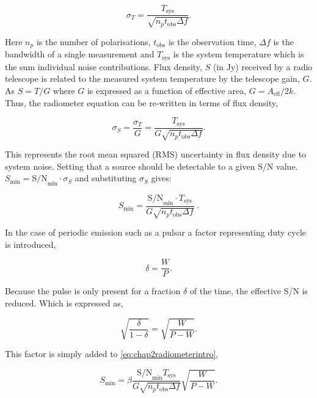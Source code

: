 \begin{equation}
    \sigma_T = \frac{T_{\text{sys}}}{\sqrt{n_p t_{\text{obs}} \Delta f}}. 
\end{equation}

Here $n_p$ is the number of polarisations, $t_{\text{obs}}$ is the observation time, $\Delta f$ is the bandwidth of a single measurement and  $T_{\text{sys}}$ is the system temperature which is the sum individual noise contributions. Flux density, $S$ (in Jy) received by a radio telescope is related to the measured system temperature by the telescope gain, $G$. As $S = T/G$ where $G$ is expressed as a function of effective area, $G = A_{\text{eff}}/{2k}$. Thus, the radiometer equation can be re-written in terms of flux density,

\begin{equation}
    \sigma_S = \frac{\sigma_T}{G} = \frac{T_{\text{sys}}}{G \sqrt{n_p t_{\text{obs}} \Delta f}}.
\end{equation}

This represents the root mean squared (RMS) uncertainty in flux density due to system noise. Setting that a source should be detectable to a given S/N value. $ S_{\min} = \text{S/N}_{\min} \cdot \sigma_S$ and substituting $\sigma_S$ gives: 

\begin{equation}
    S_{\min} = \frac{\text{S/N}_{\min} \cdot T_{\text{sys}}}{G \sqrt{n_p t_{\text{obs}} \Delta f}}\;.
    \label{eq:chap2radiometerintro}
\end{equation}


In the case of periodic emission such as a pulsar a factor representing duty cycle is introduced,

\begin{equation}
    \delta = \frac{W}{P}.
\end{equation}


Because the pulse is only present for a fraction \( \delta \) of the time, the effective S/N is reduced. Which is expressed as, 

\begin{equation}
    \sqrt{\frac{\delta}{1 - \delta}} = \sqrt{\frac{W}{P - W}}.
\end{equation}

This factor is simply added to \cref{eq:chap2radiometerintro}, 

\begin{equation}
    S_{\min} = \beta \frac{\text{S/N}_{\min} T_{\text{sys}}}{G \sqrt{n_p t_{\text{obs}} \Delta f}} \sqrt{\frac{W}{P - W}}. 
\end{equation}

